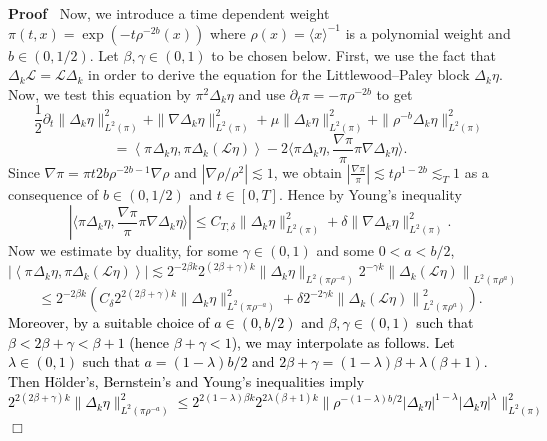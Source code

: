 \documentclass[a4paper,11pt]{article}
\newenvironment{proof}{\noindent\textbf{Proof\ }}{\hspace*{\fill}$\Box$\medskip}
\numberwithin{equation}{section}
\newcommand{\LL}{\mathscr{L}}
\newcommand{\rmbb}[1]{\textcolor{black}{#1}}
\newcommand{\8}{\infty}
\begin{document}
\begin{proof}
  Now, we introduce a time dependent weight $\pi (t, x) = \exp (- t \rho^{- 2
  b} (x))$ where $\rho (x) = \langle x \rangle^{- 1}$ is a polynomial weight
  and $b \in (0, 1 / 2)$. Let $\beta, \gamma \in (0, 1)$ to be chosen below.
  First, we use the fact that $\Delta_k \LL = \LL \Delta_k$ in order to derive
  the equation for the Littlewood--Paley block $\Delta_k \eta$. Now, we test
  this equation by $\pi^2 \Delta_k \eta$ and use $\partial_t \pi = - \pi
  \rho^{- 2 b}$ to get
  \begin{equation}
    \frac{1}{2} \partial_t \| \Delta_k \eta \|_{L^2 (\pi)}^2 + \| \nabla
    \Delta_k \eta \|_{L^2 (\pi)}^2 + \mu \| \Delta_k \eta \|_{L^2 (\pi)}^2 +
    \| \rho^{- b} \Delta_k \eta \|_{L^2 (\pi)}^2 \label{eq:eta}
  \end{equation}
  \[ = \left\langle \pi^{} \Delta_k \eta, \pi \Delta_k \left( \LL \eta \right)
     \right\rangle - 2 \langle \pi \Delta_k \eta, \frac{\nabla \pi}{\pi} \pi
     \nabla \Delta_k \eta \rangle . \]
  Since $\nabla \pi = \pi t 2 b \rho^{- 2 b - 1} \nabla \rho$ and $| \nabla
  \rho / \rho^2 | \lesssim 1$, we obtain $\left| \frac{\nabla \pi}{\pi}
  \right| \lesssim t \rho^{1 - 2 b} \lesssim_T 1$ as a consequence of $b \in
  (0, 1 / 2)$ and $t \in [0, T]$. Hence by Young's inequality
  \[ | \langle \pi \Delta_k \eta, \frac{\nabla \pi}{\pi} \pi \nabla \Delta_k
     \eta \rangle | \leqslant C_{T, \delta} \|  \Delta_k \eta
     \|_{L^2 (\pi)}^2 + \delta \| \nabla \Delta_k \eta \|_{L^2 (\pi)}^2 . \]
  Now we estimate by duality, for some $\gamma \in (0, 1)$ and some $0 < a < b
  / 2$,
  \[ \left| \left\langle \pi^{} \Delta_k \eta, \pi \Delta_k \left( \LL \eta
     \right) \right\rangle \right| \lesssim 2^{- 2 \beta k} 2^{(2 \beta +
     \gamma) k} \| \Delta_k \eta \|_{L^2 (\pi \rho^{- a})} 2^{- \gamma k}
     \left\| \Delta_k \left( \LL \eta \right) \right\|_{L^2 (\pi \rho^a)} \]
  \[ \leqslant 2^{- 2 \beta k} \left( C_{\delta} 2^{2 (2 \beta + \gamma) k} \|
     \Delta_k \eta \|^2_{L^2 (\pi \rho^{- a})} + \delta 2^{- 2 \gamma k}
     \left\| \Delta_k \left( \LL \eta \right) \right\|^2_{L^2 (\pi \rho^a)}
     \right) . \]
 \rmbb{ Moreover, by a suitable choice of $a \in (0, b / 2)$ and $\beta, \gamma \in
  (0, 1)$ such that $\beta < 2 \beta + \gamma < \beta + 1$ (hence $\beta +
  \gamma < 1$), we may interpolate as follows. Let $\lambda\in (0,1)$ such that $a=(1-\lambda) b/2$ and $2\beta+\gamma=(1-\lambda)\beta+\lambda(\beta+1)$. Then H\"older's, Bernstein's and Young's  inequalities imply
  \[ 2^{2 (2 \beta + \gamma) k} \| \Delta_k \eta \|^2_{L^2 (\pi \rho^{-
     a})} \leqslant 2^{2(1-\lambda)\beta k} 2^{2\lambda(\beta+1)k} \|\rho^{-(1-\lambda)b/2} |\Delta_k \eta|^{1-\lambda} |\Delta_k \eta|^{\lambda} \|^2_{L^2 (\pi )}
\]}
\end{proof}
\end{document}
